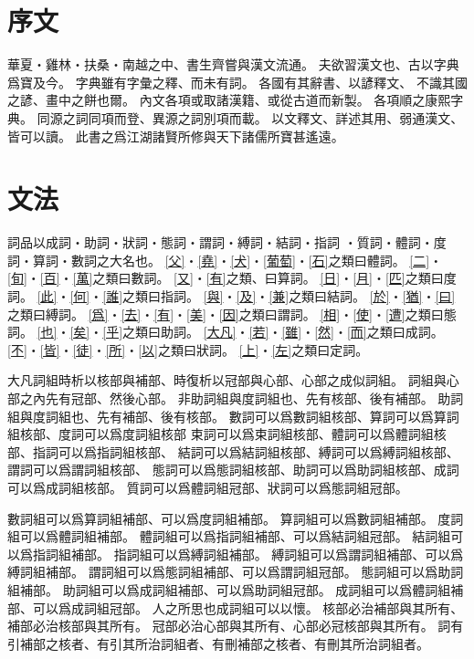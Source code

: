 \chapter*{序文}
華夏・雞林・扶桑・南越之中、書生齊嘗與漢文流通。
夫欲習漢文也、古以字典爲寶及今。
字典雖有字彙之釋、而未有詞。
各國有其辭書、以諺釋文、
不識其國之諺、畫中之餅也爾。
內文各項或取諸漢籍、或從古道而新製。
各項順之康熙字典。
同源之詞同項而登、異源之詞別項而載。
以文釋文、詳述其用、弱通漢文、皆可以讀。
此書之爲江湖諸賢所修與天下諸儒所寶甚遙遠。
\chapter*{文法}
詞品以成詞・助詞・狀詞・態詞・謂詞・縛詞・結詞・指詞
・質詞・體詞・度詞・算詞・數詞之大名也。
\cref{父}・\cref{堯}・\cref{犬}・\cref{葡萄}・\cref{石}之類曰體詞。
\cref{二}・\cref{旬}・\cref{百}・\cref{萬}之類曰數詞。
\cref{又}・\cref{有}之類、曰算詞。
\cref{日}・\cref{月}・\cref{匹}之類曰度詞。
\cref{此}・\cref{何}・\cref{誰}之類曰指詞。
\cref{與}・\cref{及}・\cref{兼}之類曰結詞。
\cref{於}・\cref{猶}・\cref{曰}之類曰縛詞。
\cref{爲}・\cref{去}・\cref{有}・\cref{美}・\cref{因}之類曰謂詞。
\cref{相}・\cref{使}・\cref{遭}之類曰態詞。
\cref{也}・\cref{矣}・\cref{乎}之類曰助詞。
\cref{大凡}・\cref{若}・\cref{雖}・\cref{然}・\cref{而}之類曰成詞。
\cref{不}・\cref{皆}・\cref{徒}・\cref{所}・\cref{以}之類曰狀詞。
\cref{上}・\cref{左}之類曰定詞。

大凡詞組時析以核部與補部、時復析以冠部與心部、心部之成似詞組。
詞組與心部之內先有冠部、然後心部。
非助詞組與度詞組也、先有核部、後有補部。
助詞組與度詞組也、先有補部、後有核部。
數詞可以爲數詞組核部、算詞可以爲算詞組核部、度詞可以爲度詞組核部
束詞可以爲束詞組核部、體詞可以爲體詞組核部、指詞可以爲指詞組核部、
結詞可以爲結詞組核部、縛詞可以爲縛詞組核部、謂詞可以爲謂詞組核部、
態詞可以爲態詞組核部、助詞可以爲助詞組核部、成詞可以爲成詞組核部。
質詞可以爲體詞組冠部、狀詞可以爲態詞組冠部。

數詞組可以爲算詞組補部、可以爲度詞組補部。
算詞組可以爲數詞組補部。
度詞組可以爲體詞組補部。
體詞組可以爲指詞組補部、可以爲結詞組冠部。
結詞組可以爲指詞組補部。
指詞組可以爲縛詞組補部。
縛詞組可以爲謂詞組補部、可以爲縛詞組補部。
謂詞組可以爲態詞組補部、可以爲謂詞組冠部。
態詞組可以爲助詞組補部。
助詞組可以爲成詞組補部、可以爲助詞組冠部。
成詞組可以爲體詞組補部、可以爲成詞組冠部。
人之所思也成詞組可以以懷。
核部必治補部與其所有、補部必治核部與其所有。
冠部必治心部與其所有、心部必冠核部與其所有。
詞有引補部之核者、有引其所治詞組者、有刪補部之核者、有刪其所治詞組者。
